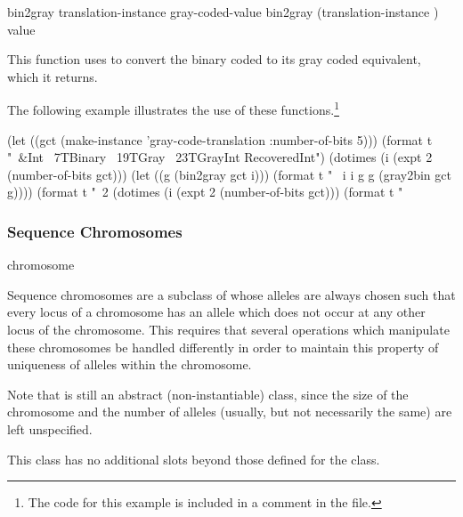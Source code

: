 {\filbreak
{\samepage
\Defgeneric bin2gray {translation-instance gray-coded-value}
 bin2gray {(translation-instance ) value}

This function uses  to convert the binary coded
 to its gray coded equivalent, which it returns.
\par}%

\gap

\filbreak
{\samepage
The following example illustrates the use of these functions.\footnote{The code for
this example is included in a comment in the  file.}
\begin{clcode}
(let ((gct (make-instance 'gray-code-translation
             :number-of-bits 5)))
  (format t "~&Int ~7TBinary ~19TGray ~23TGrayInt  RecoveredInt")
  (dotimes (i (expt 2 (number-of-bits gct)))
    (let ((g (bin2gray gct i)))
      (format t "~%
              i i g g (gray2bin gct g))))
  (format t "~2%
  (dotimes (i (expt 2 (number-of-bits gct)))
    (format t "~%
\end{clcode}
}%


\filbreak
{\samepage
\subsubsection{Sequence Chromosomes} \label{sec:sequence-chromosomes}

 {chromosome}

Sequence chromosomes are a subclass of  whose alleles are always
chosen such that every locus of a chromosome has an allele which does not occur at any
other locus of the chromosome. This requires that several operations which manipulate
these chromosomes be handled differently in order to maintain this property of uniqueness
of alleles within the chromosome.
\par}%

\filbreak
Note that  is still an abstract (non-instantiable) class,
since the size of the chromosome and the number of alleles (usually, but not necessarily
the same) are left unspecified.

\gap\filbreak

This class has no additional slots beyond those defined for the
 class.

\gap\filbreak
{\samepage


}}
